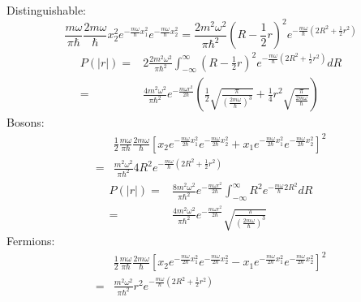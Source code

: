 \begin{enumerate}
        Distinguishable:
        $$
        \frac{m\omega}{\pi\hbar}
        \frac{2m\omega}{\hbar}
        x_2^2
        e^{-\frac{m\omega}{\hbar}x_1^2}
        e^{-\frac{m\omega}{\hbar}x_2^2}
        =
        \frac{2m^2\omega^2}{\pi\hbar^2}
        (R-\frac{1}{2}r)^2
        e^{-\frac{m\omega}{\hbar}(2R^2+\frac{1}{2}r^2)}
        $$
        \begin{align*}
            P(|r|)
        =&
        2\frac{2m^2\omega^2}{\pi\hbar^2}
        \int_{-\infty}^\infty
        (R-\frac{1}{2}r)^2
        e^{-\frac{m\omega}{\hbar}(2R^2+\frac{1}{2}r^2)}dR\\
        =&
        \frac{4m^2\omega^2}{\pi\hbar^2}
        e^{-\frac{m\omega r^2}{2\hbar}}
        \left(\frac{1}{2}\sqrt{\frac{\pi}{(\frac{2m\omega}{\hbar})^3}}
        +\frac{1}{4}r^2
        \sqrt{\frac{\pi}{\frac{2m\omega}{\hbar}}}
        \right)
        \end{align*}
        Bosons:
        \begin{align*}
            &\frac{1}{2}
        \frac{m\omega}{\pi\hbar}
        \frac{2m\omega}{\hbar}
        \left[
        x_2
        e^{-\frac{m\omega}{2\hbar}x_1^2}
        e^{-\frac{m\omega}{2\hbar}x_2^2}
        +
        x_1
        e^{-\frac{m\omega}{2\hbar}x_1^2}
        e^{-\frac{m\omega}{2\hbar}x_2^2}
        \right]^2\\
        =&
        \frac{m^2\omega^2}{\pi\hbar^2}
        4R^2
        e^{-\frac{m\omega}{\hbar}(2R^2+\frac{1}{2}r^2)}
        \end{align*}
        \begin{align*}
            P(|r|)
            =&
            \frac{8m^2\omega^2}{\pi\hbar^2}
        e^{-\frac{m\omega r^2}{2\hbar}}
        \int_{-\infty}^{\infty}
        R^2
        e^{-\frac{m\omega}{\hbar}2R^2}dR\\
        =&
        \frac{4m^2\omega^2}{\pi\hbar^2}
        e^{-\frac{m\omega r^2}{2\hbar}}
        \sqrt{\frac{\pi}{(\frac{2m\omega}{\hbar})^3}}
        \end{align*}
        Fermions:
        \begin{align*}
            &\frac{1}{2}
        \frac{m\omega}{\pi\hbar}
        \frac{2m\omega}{\hbar}
        \left[
        x_2
        e^{-\frac{m\omega}{2\hbar}x_1^2}
        e^{-\frac{m\omega}{2\hbar}x_2^2}
        -
        x_1
        e^{-\frac{m\omega}{2\hbar}x_1^2}
        e^{-\frac{m\omega}{2\hbar}x_2^2}
        \right]^2\\
        =&
        \frac{m^2\omega^2}{\pi\hbar^2}
        r^2
        e^{-\frac{m\omega}{\hbar}(2R^2+\frac{1}{2}r^2)}

\end{align*}
\end{enumerate}
